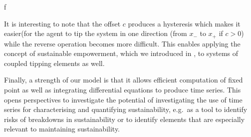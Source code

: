 \documentclass[conference]{IEEEtran}
\begin{document}
f%

It is interesting to note that the offset $c$ produces a hysteresis
which makes it easier(for the agent to tip the system in one direction
(from $x_{-}$ to $x_{+}$ if $c > 0$) while the reverse operation
becomes more difficult. This enables applying the concept of
sustainable empowerment, which we introduced in
\cite{Kim2009_sustainability}, to systems of coupled tipping elements
as well.

Finally, a strength of our model is that it allows efficient
computation of fixed point as well as integrating differential
equations to produce time series. This opens perspectives to
investigate the potential of investigating the use of time series for
characterising and quantifying sustainability, e.g.\ as a tool to
identify risks of breakdowns in sustainability or to identify elements
that are especially relevant to maintaining sustainability.





\end{document}
